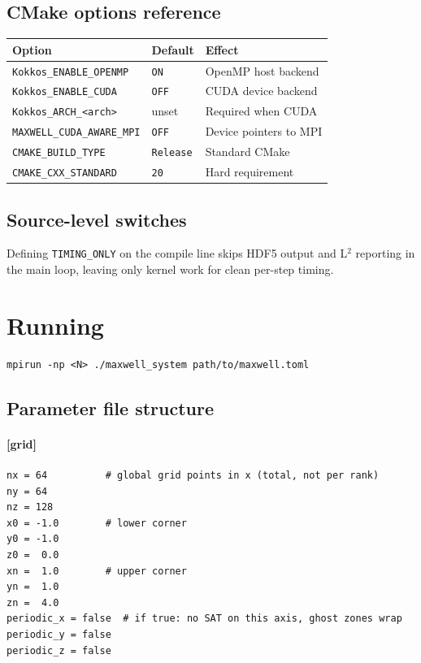 \documentclass[11pt]{article}
\begin{document}
\subsection{CMake options reference}

\begin{center}
\small
\begin{tabular}{@{}lll@{}}
\toprule
Option & Default & Effect \\
\midrule
\texttt{Kokkos\_ENABLE\_OPENMP}    & \texttt{ON}      & OpenMP host backend \\
\texttt{Kokkos\_ENABLE\_CUDA}      & \texttt{OFF}     & CUDA device backend \\
\texttt{Kokkos\_ARCH\_<arch>}      & unset            & Required when CUDA \\
\texttt{MAXWELL\_CUDA\_AWARE\_MPI} & \texttt{OFF}     & Device pointers to MPI \\
\texttt{CMAKE\_BUILD\_TYPE}        & \texttt{Release} & Standard CMake \\
\texttt{CMAKE\_CXX\_STANDARD}      & \texttt{20}      & Hard requirement \\
\bottomrule
\end{tabular}
\end{center}

\subsection{Source-level switches}

Defining \texttt{TIMING\_ONLY} on the compile line skips HDF5
output and L$^2$ reporting in the main loop, leaving only kernel
work for clean per-step timing.

\section{Running}
\label{sec:running}

\begin{lstlisting}[style=shell]
mpirun -np <N> ./maxwell_system path/to/maxwell.toml
\end{lstlisting}

\subsection{Parameter file structure}
\label{sec:toml}

\paragraph{[grid]}
\begin{lstlisting}[style=shell]
nx = 64          # global grid points in x (total, not per rank)
ny = 64
nz = 128
x0 = -1.0        # lower corner
y0 = -1.0
z0 =  0.0
xn =  1.0        # upper corner
yn =  1.0
zn =  4.0
periodic_x = false  # if true: no SAT on this axis, ghost zones wrap
periodic_y = false
periodic_z = false
\end{lstlisting}
\end{document}
